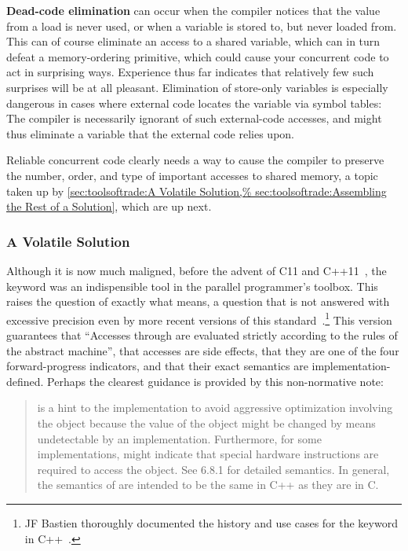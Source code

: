 {\bf Dead-code elimination} can occur when the compiler notices that
the value from a load is never used, or when a variable is stored to,
but never loaded from.
This can of course eliminate an access to a shared variable, which
can in turn defeat a memory-ordering primitive, which could cause your
concurrent code to act in surprising ways.
Experience thus far indicates that relatively few such surprises will
be at all pleasant.
Elimination of store-only variables is especially dangerous in cases
where external code locates the variable via symbol tables:
The compiler is necessarily ignorant of such external-code accesses,
and might thus eliminate a variable that the external code relies upon.

Reliable concurrent code clearly needs a way to cause the compiler to
preserve the number, order, and type of important accesses to shared
memory, a topic taken up by
\cref{sec:toolsoftrade:A Volatile Solution,%
sec:toolsoftrade:Assembling the Rest of a Solution},
which are up next.

\subsubsection{A Volatile Solution}
\label{sec:toolsoftrade:A Volatile Solution}

Although it is now much maligned, before the advent of C11 and
C++11~\cite{PeteBecker2011N3242}, the  keyword was an
indispensible tool in the parallel programmer's toolbox.
This raises the question of exactly what  means,
a question that is not answered with excessive precision even
by more recent versions of this standard~\cite{RichardSmith2019N4800}.\footnote{
	JF Bastien thoroughly documented the history and use cases
	for the  keyword in
	C++~\cite{JFBastien2018DeprecatingVolatile}.}
This version guarantees that ``Accesses through 
 are evaluated strictly according to the rules of the
abstract machine'',
that  accesses are side effects,
that they are one of the four forward-progress indicators,
and that their exact semantics are implementation-defined.
Perhaps the clearest guidance is provided by this non-normative note:

\begin{quote}
	 is a hint to the implementation to avoid
	aggressive optimization involving the object because the value
	of the object might be changed by means undetectable by an
	implementation.
	Furthermore, for some implementations,  might indicate
	that special hardware instructions are required to access
	the object.
	See 6.8.1 for detailed semantics.
	In general, the semantics of  are intended to be the
	same in C++ as they are in C.
\end{quote}

